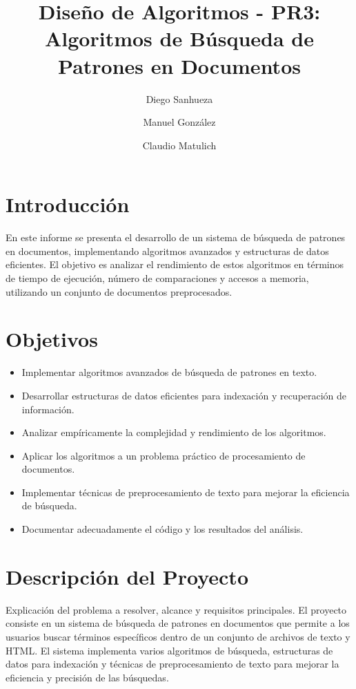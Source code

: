 \documentclass[9pt,letterpaper,onecolumn]{rho-class/rho}
\title{}
\author[$\dagger$]{Diego Sanhueza}
\author[$\dagger$]{Manuel González}
\author[$\dagger$]{Claudio Matulich}
\affil[$\dagger$]{Universidad de Magallanes}
\title{Diseño de Algoritmos - PR3: Algoritmos de Búsqueda de Patrones en Documentos}
\begin{document}
\maketitle
\thispagestyle{firststyle}
\tableofcontents


\section{Introducción}
En este informe se presenta el desarrollo de un sistema de búsqueda de patrones en documentos, implementando algoritmos avanzados y estructuras de datos eficientes. El objetivo es analizar el rendimiento de estos algoritmos en términos de tiempo de ejecución, número de comparaciones y accesos a memoria, utilizando un conjunto de documentos preprocesados.

\section{Objetivos}
\begin{itemize}
    \item Implementar algoritmos avanzados de búsqueda de patrones en texto.
    \item Desarrollar estructuras de datos eficientes para indexación y recuperación de información.
    \item Analizar empíricamente la complejidad y rendimiento de los algoritmos.
    \item Aplicar los algoritmos a un problema práctico de procesamiento de documentos.
    \item Implementar técnicas de preprocesamiento de texto para mejorar la eficiencia de búsqueda.
    \item Documentar adecuadamente el código y los resultados del análisis.
\end{itemize}

\section{Descripción del Proyecto}
Explicación del problema a resolver, alcance y requisitos principales.
El proyecto consiste en un sistema de búsqueda de patrones en documentos que permite a los usuarios buscar términos específicos dentro de un conjunto de archivos de texto y HTML. El sistema implementa varios algoritmos de búsqueda, estructuras de datos para indexación y técnicas de preprocesamiento de texto para mejorar la eficiencia y precisión de las búsquedas.
\end{document}
